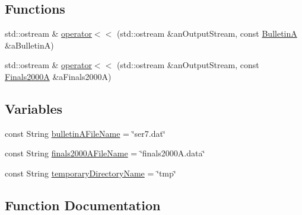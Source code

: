 \subsection*{Functions}
\begin{DoxyCompactItemize}
\item 
std\+::ostream \& \hyperlink{namespacelibrary_1_1physics_1_1coord_1_1frame_1_1provider_1_1iers_a07458b824777a56a263317f7c6351bda}{operator$<$$<$} (std\+::ostream \&an\+Output\+Stream, const \hyperlink{classlibrary_1_1physics_1_1coord_1_1frame_1_1provider_1_1iers_1_1_bulletin_a}{BulletinA} \&a\+BulletinA)
\item 
std\+::ostream \& \hyperlink{namespacelibrary_1_1physics_1_1coord_1_1frame_1_1provider_1_1iers_a5f470e0a9b85d66ce6e8b07f26c3c342}{operator$<$$<$} (std\+::ostream \&an\+Output\+Stream, const \hyperlink{classlibrary_1_1physics_1_1coord_1_1frame_1_1provider_1_1iers_1_1_finals2000_a}{Finals2000A} \&a\+Finals2000A)
\end{DoxyCompactItemize}
\subsection*{Variables}
\begin{DoxyCompactItemize}
\item 
const String \hyperlink{namespacelibrary_1_1physics_1_1coord_1_1frame_1_1provider_1_1iers_a74902a6b275513970fb5d77f337da788}{bulletin\+A\+File\+Name} = \char`\"{}ser7.\+dat\char`\"{}
\item 
const String \hyperlink{namespacelibrary_1_1physics_1_1coord_1_1frame_1_1provider_1_1iers_acbca40e7605700724acf924be0c922a1}{finals2000\+A\+File\+Name} = \char`\"{}finals2000\+A.\+data\char`\"{}
\item 
const String \hyperlink{namespacelibrary_1_1physics_1_1coord_1_1frame_1_1provider_1_1iers_acda6d9c00dfd330465fcca24a19549ce}{temporary\+Directory\+Name} = \char`\"{}tmp\char`\"{}
\end{DoxyCompactItemize}


\subsection{Function Documentation}
\mbox{\label{namespacelibrary_1_1physics_1_1coord_1_1frame_1_1provider_1_1iers_a07458b824777a56a263317f7c6351bda}} 
